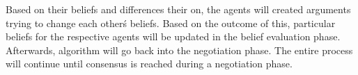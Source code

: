  Based on their beliefs and differences their on, 
the agents will created arguments trying to change each other\'s beliefs. 
Based on the outcome of this, particular beliefs for the respective agents 
will be updated in the belief evaluation phase. Afterwards, algorithm will 
go back into the negotiation phase. The entire process will continue until 
consensus is reached during a negotiation phase.